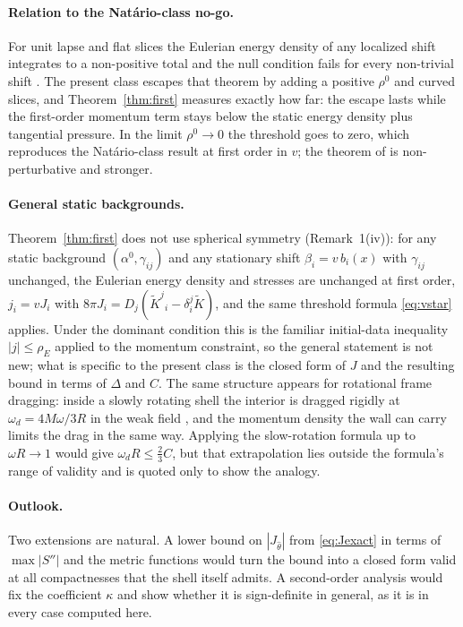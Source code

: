 \documentclass[11pt,a4paper]{article}
\theoremstyle{remark}
\newcommand{\Ks}{\tilde K}
\begin{document}
\paragraph{Relation to the Nat\'ario-class no-go.} For unit lapse and flat slices the Eulerian energy density of any localized shift integrates to a non-positive total and the null condition fails for every non-trivial shift \cite{SSV2022}. The present class escapes that theorem by adding a positive $\rho^0$ and curved slices, and Theorem~\ref{thm:first} measures exactly how far: the escape lasts while the first-order momentum term stays below the static energy density plus tangential pressure. In the limit $\rho^0 \to 0$ the threshold goes to zero, which reproduces the Nat\'ario-class result at first order in $v$; the theorem of \cite{SSV2022} is non-perturbative and stronger.

\paragraph{General static backgrounds.} Theorem~\ref{thm:first} does not use spherical symmetry (Remark~1(iv)): for any static background $(\alpha^0,\gamma_{ij})$ and any stationary shift $\beta_i = v\,b_i(x)$ with $\gamma_{ij}$ unchanged, the Eulerian energy density and stresses are unchanged at first order, $j_i = vJ_i$ with $8\pi J_i = D_j(\Ks^j{}_i - \delta^j_i\Ks)$, and the same threshold formula \eqref{eq:vstar} applies. Under the dominant condition this is the familiar initial-data inequality $|j| \le \rho_E$ applied to the momentum constraint, so the general statement is not new; what is specific to the present class is the closed form of $J$ and the resulting bound in terms of $\Delta$ and $C$. The same structure appears for rotational frame dragging: inside a slowly rotating shell the interior is dragged rigidly at $\omega_d = 4M\omega/3R$ in the weak field \cite{Thirring1918}, and the momentum density the wall can carry limits the drag in the same way. Applying the slow-rotation formula up to $\omega R \to 1$ would give $\omega_d R \le \tfrac23 C$, but that extrapolation lies outside the formula's range of validity and is quoted only to show the analogy.

\paragraph{Outlook.} Two extensions are natural. A lower bound on $|J_{\hat\theta}|$ from \eqref{eq:Jexact} in terms of $\max|S''|$ and the metric functions would turn the bound into a closed form valid at all compactnesses that the shell itself admits. A second-order analysis would fix the coefficient $\kappa$ and show whether it is sign-definite in general, as it is in every case computed here.
\end{document}
